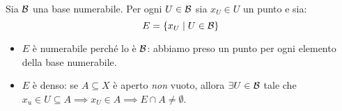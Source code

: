 \begin{demonstration}
	Sia $\mathcal{B}$ una base numerabile. Per ogni $U\in\mathcal{B}$ sia $x_U\in U$ un punto e sia:
	\begin{equation*}
		E=\left\{x_U\mid U\in \mathcal{B}\right\}
	\end{equation*}
\begin{itemize}
	\item $E$ è numerabile perché lo è $\mathcal{B}$: abbiamo preso un punto per ogni elemento della base numerabile.
	\item $E$ è denso: se $A\subseteq X$ è aperto \textit{non} vuoto, allora $\exists U\in\mathcal{B}$ tale che $x_u\in U\subseteq A\implies x_U\in A\implies E\cap A\neq \emptyset$.
\end{itemize}
\end{demonstration}

%
%
